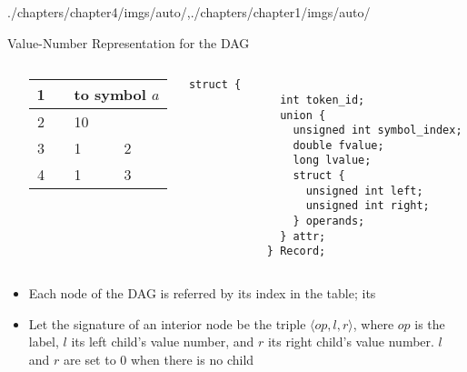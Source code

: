\begin{graphicspathcontext}{{./chapters/chapter4/imgs/auto/},{./chapters/chapter1/imgs/auto/}}
\begin{bibunit}[apalike]
\begin{frame}[fragile]{{Value-Number Representation} for the DAG}
	\begin{footnotesize}
	\begin{columns}
		\begin{column}{.1\linewidth}
		\end{column}
		\begin{column}{.45\linewidth}
			\begin{scriptsize}
			\begin{tabularx}{\linewidth}{|c|X|X|X|}
				\hline
				1 & \sddts{id} & \multicolumn{2}{l|}{to symbol $a$} \\
				\hline
				2 & \sddts{num} & \multicolumn{2}{l|}{10} \\
				\hline
				3 & \sddts{+} & 1 & 2 \\
				\hline
				4 & \sddts{=} & 1 & 3 \\
				\hline
			\end{tabularx}
			\end{scriptsize}
		\end{column}
		\begin{column}{.45\linewidth}
			\begin{scriptsize}
			\begin{lstlisting}[style=lststyle-c,basicstyle=\tiny]
			struct {
			  int token_id;
			  union {
			    unsigned int symbol_index;
			    double fvalue;
			    long lvalue;
			    struct {
			      unsigned int left;
			      unsigned int right;
			    } operands;
			  } attr;
			} Record;
			\end{lstlisting}
			\end{scriptsize}
		\end{column}
	\end{columns}
	\begin{itemize}
	\item Each node of the DAG is referred by its index in the table; its 
	\item Let the signature of an interior node be the triple $\langle op,l,r \rangle$, where $op$ is the label, $l$ its left child's value number, and $r$ its right child's value number. $l$ and $r$ are set to $0$ when there is no child
	\end{itemize}
	\end{footnotesize}
\end{frame}


\end{bibunit}
\end{graphicspathcontext}
